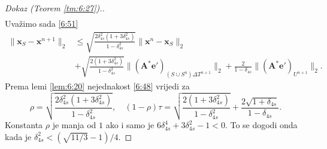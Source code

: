 \documentclass[a4paper,twoside,12pt]{memoir} %
\newcommand{\vect}[1]{\mathbf{#1}}
\renewcommand{\vec}{\vect}
\newcommand{\norm}[1]{\|{#1}\|}
\begin{document}
\begin{proof}[Dokaz (Teorem \ref{tm:6:27}).]
\begin{align*}
    \end{align*}
    Uva\v{z}imo sada \eqref{6:51}
    \begin{align*}
        \norm{\vec x_S - \vec x^{n+1}}_2 & \leq \sqrt{\frac{2\delta_{4s}^2 (1+3 \delta_{4s}^2)}{1 - \delta_{4s}^2}} \norm{\vec x^n - \vec x_S}_2\\[0.5em]
        & + \sqrt{\frac{2(1+3 \delta_{4s}^2)}{1- \delta_{4s}^2}} \norm{(\vec A^* \vec e')_{(S \cup S^n) \Delta T^{n+1}}}_2  + \frac{2}{1-\delta_{4s}} \norm{(\vec A^* \vec e')_{U^{n+1}}}_2. 
    \end{align*}
    Prema lemi \ref{lem:6:20} nejednakost \eqref{6:48} vrijedi za
    \begin{equation}
        \rho = \sqrt{\frac{2\delta_{4s}^2 (1+3 \delta_{4s}^2)}{1 - \delta_{4s}^2}}, \quad (1-\rho)\tau = \sqrt{\frac{2(1+3 \delta_{4s}^2)}{1- \delta_{4s}^2}} + \frac{2 \sqrt{1+ \delta_{4s}}}{1-\delta_{4s}}. 
    \end{equation}
    Konstanta $\rho$ je manja od $1$ ako i samo je $6 \delta_{4s}^4 + 3 \delta_{4s}^2 - 1 < 0$. To se dogodi onda kada je $\delta_{4s}^2 < (\sqrt{11/3} - 1)/4$.

\end{proof}



 
\pagestyle{empty} %

\end{document}
